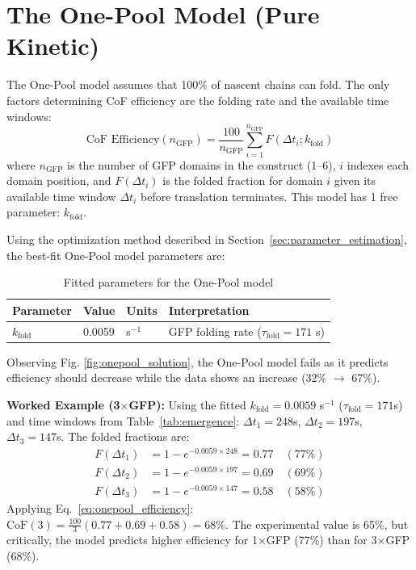 \documentclass[11pt,a4paper]{article}
\newcommand{\kfold}{k_{\text{fold}}}
\newcommand{\taufold}{\tau_{\text{fold}}}
\begin{document}
\section{The One-Pool Model (Pure Kinetic)}
\label{sec:onepool}

The One-Pool model assumes that 100\% of nascent chains can fold. The only factors determining CoF efficiency are the folding rate and the available time windows:
\begin{equation}
\text{CoF Efficiency}(n_{\text{GFP}}) = \frac{100}{n_{\text{GFP}}} \sum_{i=1}^{n_{\text{GFP}}} F(\Delta t_i; \kfold)
\label{eq:onepool_efficiency}
\end{equation}
where $n_{\text{GFP}}$ is the number of GFP domains in the construct (1--6), $i$ indexes each domain position, and $F(\Delta t_i)$ is the folded fraction for domain $i$ given its available time window $\Delta t_i$ before translation terminates. This model has 1 free parameter: $\kfold$.

Using the optimization method described in Section~\ref{sec:parameter_estimation}, the best-fit One-Pool model parameters are:

\begin{table}[H]
\centering
\caption{Fitted parameters for the One-Pool model}
\label{tab:onepool_params}
\begin{tabular}{@{}llll@{}}
\toprule
\textbf{Parameter} & \textbf{Value} & \textbf{Units} & \textbf{Interpretation} \\
\midrule
$\kfold$ & 0.0059 & s$^{-1}$ & GFP folding rate ($\taufold = 171$ s) \\
\bottomrule
\end{tabular}
\end{table}

Observing Fig. \ref{fig:onepool_solution}, the One-Pool model fails as it predicts efficiency should decrease while the data shows an increase (32\% $\to$ 67\%).

\begin{tcolorbox}[colback=gray!10, colframe=gray!50, arc=2mm, boxrule=0.5pt]
\textbf{Worked Example (3$\times$GFP):} Using the fitted $\kfold = 0.0059$ s$^{-1}$ ($\taufold = 171$s) and time windows from Table~\ref{tab:emergence}: $\Delta t_1 = 248$s, $\Delta t_2 = 197$s, $\Delta t_3 = 147$s. The folded fractions are:
\begin{align*}
F(\Delta t_1) &= 1 - e^{-0.0059 \times 248} = 0.77 \quad (77\%) \\
F(\Delta t_2) &= 1 - e^{-0.0059 \times 197} = 0.69 \quad (69\%) \\
F(\Delta t_3) &= 1 - e^{-0.0059 \times 147} = 0.58 \quad (58\%)
\end{align*}
Applying Eq.~\ref{eq:onepool_efficiency}: $\text{CoF}(3) = \frac{100}{3}(0.77 + 0.69 + 0.58) = 68\%$. The experimental value is 65\%, but critically, the model predicts higher efficiency for 1$\times$GFP (77\%) than for 3$\times$GFP (68\%).
\end{tcolorbox}
\end{document}
